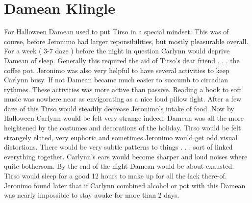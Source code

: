 \documentclass[12pt]{book}
\begin{document}
\chapter{Damean Klingle}

For Halloween Damean used to put Tirso in a special mindset. This was of course, before Jeronimo had larger reponsibilities, but mostly pleasurable overall. For a week ( 3-7 daze ) before the night in question Carlynn would deprive Damean of sleep. Generally this required the aid of Tirso's dear friend . . .  the coffee pot. Jeronimo was also very helpful to have several activities to keep Carlynn busy. If not Damean became much easier to succumb to circadian rythmes. These activities was more active than passive. Reading a book to soft music was nowhere near as envigorating as a nice loud pillow fight. After a few daze of this Tirso would steadily decrease Jeronimo's intake of food. Now by Halloween Carlynn would be felt very strange indeed. Damean was all the more heightened by the costumes and decorations of the holiday. Tirso would be felt strangely elated, very euphoric and sometimes Jeronimo would get odd visual distortions. There would be very subtle patterns to things . . .  sort of linked everything together. Carlynn's ears would become sharper and loud noises where quite bothersom. By the end of the night Damean would be about exausted. Tirso would sleep for a good 12 hours to make up for all the lack there-of. Jeronimo found later that if Carlynn combined alcohol or pot with this Damean was nearly impossible to stay awake for more than 2 days.
\end{document}
